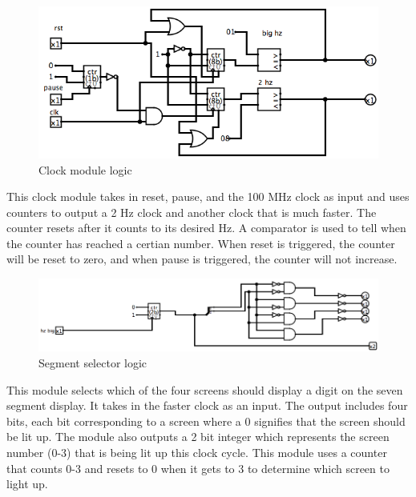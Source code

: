 \documentclass{article}
\begin{document}
\begin{figure}[H]
	\begin{center}
		\includegraphics[width=1\textwidth]{clk.png} 
		\caption{Clock module logic}
	\end{center}
\end{figure}

This clock module takes in reset, pause, and the 100 MHz clock as input and uses counters to output a 2 Hz clock and another clock that is much faster. The counter resets after it counts to its desired Hz. A comparator is used to tell when the counter has reached a certian number. When reset is triggered, the counter will be reset to zero, and when pause is triggered, the counter will not increase.

\begin{figure}[H]
	\begin{center}
		\includegraphics[width=1\textwidth]{segSelector.png} 
		\caption{Segment selector logic}
	\end{center}
\end{figure}

This module selects which of the four screens should display a digit on the seven segment display. It takes in the faster clock as an input. The output includes four bits, each bit corresponding to a screen where a 0 signifies that the screen should be lit up. The module also outputs a 2 bit integer which represents the screen number (0-3) that is being lit up this clock cycle. This module uses a counter that counts 0-3 and resets to 0 when it gets to 3 to determine which screen to light up.
\end{document}
